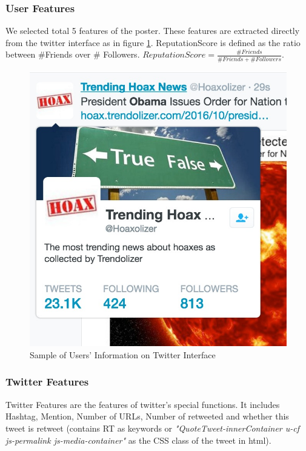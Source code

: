 \subsubsection{User Features} We selected total 5 features of the poster. These features are extracted directly from the twitter interface as in figure \ref{fig:UserSample}. ReputationScore is defined as the ratio between \#Friends over \# Followers. $ReputationScore = \frac {\#Friends }{\#Friends +\#Followers}$.
\begin{figure}[!h]
\centering
\includegraphics[width=0.55\columnwidth]{images/UserSample.png}
\caption{Sample of Users' Information on Twitter Interface}
\label{fig:UserSample}
\end{figure}

\subsubsection{Twitter Features} Twitter Features are the features of twitter's special functions. It includes Hashtag, Mention, Number of URLs, Number of retweeted and whether this tweet is retweet (contains RT as keywords or \emph{"QuoteTweet-innerContainer u-cf js-permalink js-media-container"} as the CSS class of the tweet in html).


